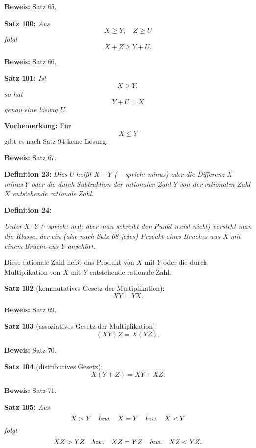 {\bf Beweis:} Satz 65.
\medskip


{\bf Satz 100:} {\it Aus
$$X \ge Y,\quad Z \ge U$$
folgt
$$X + Z \ge Y + U.$$}%

{\bf Beweis:} Satz 66.
\medskip


{\bf Satz 101:} {\it Ist
$$X > Y,$$
so hat
$$Y + U = X$$
genau eine l\"osung $U$.}

{\bf Vorbemerkung:} F\"ur
$$X \le Y$$
gibt es nach Satz 94 keine L\"osung.


{\bf Beweis:} Satz 67.
\medskip


{\bf Definition 23:} {\it Dies $U$ hei{\ss}t $X - Y$ {\rm ($-$ sprich: minus)} oder die
Differenz $X$ minus $Y$ oder die durch Subtraktion der rationalen Zahl
$Y$ von der rationalen Zahl $X$ entstehende rationale Zahl.}
\medskip


{\bf Definition 24:} {\it Unter $X \cdot Y$ {\rm ($\cdot$ sprich: mal; aber man schreibt
den Punkt meist nicht)} versteht man die Klasse, der ein {\rm (also nach
Satz 68 jedes)} Produkt eines Bruches aus $X$ mit einem Bruche aus
$Y$ angeh\"ort.

Diese rationale Zahl hei{\ss}t das Produkt von $X$ mit $Y$ oder die
durch Multiplikation von $X$ mit $Y$ entstehende rationale Zahl.}
\medskip


{\bf Satz 102} (kommutatives Gesetz der Multiplikation):
{\it $$XY = YX.$$}%

{\bf Beweis:} Satz 69.
\medskip


{\bf Satz 103} (assoziatives Gesetz der Multiplikation):
{\it $$(XY)Z = X(YZ).$$}%

{\bf Beweis:} Satz 70.
\medskip


{\bf Satz 104} (distributives Gesetz):
{\it $$X(Y + Z) = XY + XZ.$$}%

{\bf Beweis:} Satz 71.
\medskip


{\bf Satz 105:} {\it Aus
$$X > Y\quad\hbox{\it bzw.}\quad X = Y\quad\hbox{\it bzw.}\quad X < Y$$
folgt
$$XZ > YZ\quad\hbox{\it bzw.}\quad XZ = YZ\quad\hbox{\it bzw.}\quad XZ < YZ.$$}%

